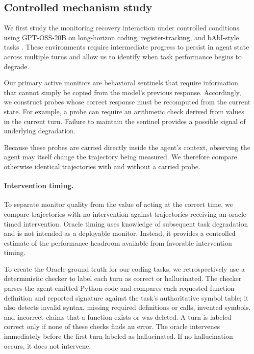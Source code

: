 \documentclass{article}
\begin{document}
\subsection{Controlled mechanism study}

We first study the monitoring recovery interaction under controlled conditions using GPT-OSS-20B on long-horizon coding, register-tracking, and bAbI-style tasks \citep{weston2015babi}. These environments require intermediate progress to persist in agent state across multiple turns and allow us to identify when task performance begins to degrade.

Our primary active monitors are behavioral sentinels that require information that cannot simply be copied from the model's previous response. Accordingly, we construct probes whose correct response must be recomputed from the current state. For example, a probe can require an arithmetic check derived from values in the current turn. Failure to maintain the sentinel provides a possible signal of underlying degradation.

Because these probes are carried directly inside the agent's context, observing the agent may itself change the trajectory being measured. We therefore compare otherwise identical trajectories with and without a carried probe.

\paragraph{Intervention timing.}
To separate monitor quality from the value of acting at the correct time, we compare trajectories with no intervention against trajectories receiving an oracle-timed intervention. Oracle timing uses knowledge of subsequent task degradation and is not intended as a deployable monitor. Instead, it provides a controlled estimate of the performance headroom available from favorable intervention timing.

To create the Oracle ground truth for our coding tasks, we retrospectively use a deterministic checker to label each turn as correct or hallucinated. The checker parses the agent-emitted Python code and compares each requested function definition and reported signature against the task's authoritative symbol table; it also detects invalid syntax, missing required definitions or calls, invented symbols, and incorrect claims that a function exists or was deleted. A turn is labeled correct only if none of these checks finds an error. The oracle intervenes immediately before the first turn labeled as hallucinated. If no hallucination occurs, it does not intervene.
\end{document}
